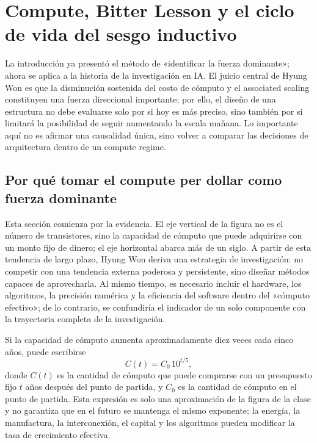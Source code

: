 \section{Compute, Bitter Lesson y el ciclo de vida del sesgo inductivo}

La introducción ya presentó el método de «identificar la fuerza dominante»; ahora se aplica a la historia de la investigación en IA. El juicio central de Hyung Won es que la disminución sostenida del costo de cómputo y el associated scaling constituyen una fuerza direccional importante; por ello, el diseño de una estructura no debe evaluarse solo por si hoy es más preciso, sino también por si limitará la posibilidad de seguir aumentando la escala mañana. Lo importante aquí no es afirmar una causalidad única, sino volver a comparar las decisiones de arquitectura dentro de un compute regime.

\subsection{Por qué tomar el compute per dollar como fuerza dominante}

Esta sección comienza por la evidencia. El eje vertical de la figura no es el número de transistores, sino la capacidad de cómputo que puede adquirirse con un monto fijo de dinero; el eje horizontal abarca más de un siglo. A partir de esta tendencia de largo plazo, Hyung Won deriva una estrategia de investigación: no competir con una tendencia externa poderosa y persistente, sino diseñar métodos capaces de aprovecharla. Al mismo tiempo, es necesario incluir el hardware, los algoritmos, la precisión numérica y la eficiencia del software dentro del «cómputo efectivo»; de lo contrario, se confundiría el indicador de un solo componente con la trayectoria completa de la investigación.


Si la capacidad de cómputo aumenta aproximadamente diez veces cada cinco años, puede escribirse
\[
C(t)=C_0\,10^{t/5},
\]
donde $C(t)$ es la cantidad de cómputo que puede comprarse con un presupuesto fijo $t$ años después del punto de partida, y $C_0$ es la cantidad de cómputo en el punto de partida. Esta expresión es solo una aproximación de la figura de la clase y no garantiza que en el futuro se mantenga el mismo exponente; la energía, la manufactura, la interconexión, el capital y los algoritmos pueden modificar la tasa de crecimiento efectiva.

